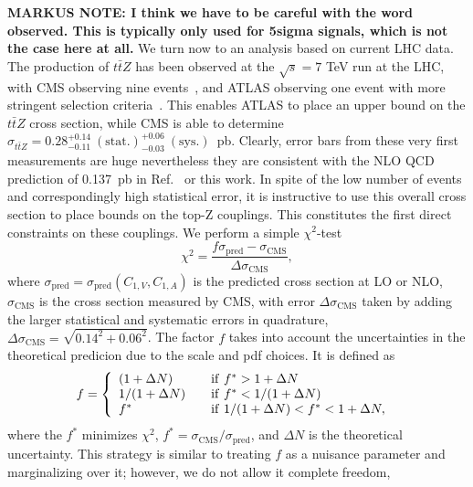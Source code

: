 \documentclass[preprint]{JHEP3}
\def\ttbZ{t\bar{t}Z}
\begin{document}
{\bf MARKUS NOTE: I think we have to be careful with the word observed. This is typically only used for 5sigma signals, which is not the case here at all.}
We turn now to an analysis based on current LHC data. The production of $\ttbZ$ has been observed at the $\sqrt{s}=7$ TeV run at the LHC, 
with CMS observing nine events~\cite{Chatrchyan:2013qca}, and ATLAS observing one event with more stringent selection criteria~\cite{ATLAS-CONF-2012-126}. 
This enables ATLAS to place an upper bound on the $\ttbZ$ cross section, 
while CMS is able to determine $\sigma_{\ttbZ} = 0.28^{+0.14}_{-0.11}~\mathrm{(stat.)}^{+0.06}_{-0.03}~ \mathrm{(sys.)}$~pb. 
Clearly, error bars from these very first measurements are huge nevertheless they are consistent with the NLO QCD prediction of 0.137~pb in Ref.~\cite{Garzelli:2011is} or this work. 
In spite of the low number of events and correspondingly high statistical error, it is instructive to use this overall cross section to place bounds on the top-Z couplings. 
This constitutes the first direct constraints on these couplings.
We perform a simple $\chi^2$-test 
\begin{equation}
\chi^2 = \frac{f \sigma_{\mathrm{pred}} - \sigma_{\mathrm{CMS}}}{\Delta \sigma_{\mathrm{CMS}}},
\end{equation}
where $\sigma_{\mathrm{pred}}=\sigma_{\mathrm{pred}}(C_{1,V},C_{1,A})$ is the predicted cross section at LO or NLO, 
$\sigma_{\mathrm{CMS}}$ is the cross section measured by CMS, with error $\Delta \sigma_{\mathrm{CMS}}$ taken by adding the larger 
statistical and systematic errors in quadrature, $\Delta \sigma_{\mathrm{CMS}}=\sqrt{0.14^2+0.06^2}$. 
The factor $f$ takes into account the uncertainties in the theoretical predicion due to the scale and pdf choices. 
It is defined as~\cite{Baur:2004uw,Baur:2005wi}
 \begin{equation}
f = \left\{ 
\begin{array} {l l}
(1+\Delta N)  & \quad \mathrm{if}~ f^* > 1 + \Delta N \\
1/(1+\Delta N)  & \quad \mathrm{if}~ f^* < 1/(1 + \Delta N) \\
f^* & \quad \mathrm{if}~ 1/(1 + \Delta N) < f^* < 1+\Delta N,
\end{array} \right.\ 
\end{equation}  
where the $f^*$ minimizes $\chi^2$, $f^* = \sigma_{\mathrm{CMS}} / \sigma_{\mathrm{pred}}$, and $\Delta N$ is the theoretical  uncertainty. 
This strategy is similar to treating $f$ as a nuisance parameter and marginalizing over it; however, we do not allow it complete freedom, 
\end{document}
